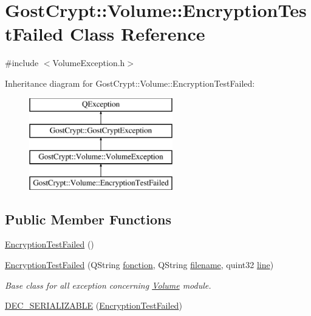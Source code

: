 \hypertarget{class_gost_crypt_1_1_volume_1_1_encryption_test_failed}{}\section{Gost\+Crypt\+:\+:Volume\+:\+:Encryption\+Test\+Failed Class Reference}
\label{class_gost_crypt_1_1_volume_1_1_encryption_test_failed}


{\ttfamily \#include $<$Volume\+Exception.\+h$>$}

Inheritance diagram for Gost\+Crypt\+:\+:Volume\+:\+:Encryption\+Test\+Failed\+:\begin{figure}[H]
\begin{center}
\leavevmode
\includegraphics[height=4.000000cm]{class_gost_crypt_1_1_volume_1_1_encryption_test_failed}
\end{center}
\end{figure}
\subsection*{Public Member Functions}
\begin{DoxyCompactItemize}
\item 
\hyperlink{class_gost_crypt_1_1_volume_1_1_encryption_test_failed_a3e1a882b6c494d5bfa33ed7c0c77e755}{Encryption\+Test\+Failed} ()
\item 
\hyperlink{class_gost_crypt_1_1_volume_1_1_encryption_test_failed_a5043d8bc7bfbff66740c512cf01531d8}{Encryption\+Test\+Failed} (Q\+String \hyperlink{class_gost_crypt_1_1_gost_crypt_exception_a29b8c93d5efbb1ff369107385725a939}{fonction}, Q\+String \hyperlink{class_gost_crypt_1_1_gost_crypt_exception_a749a12375f4ba9d502623b99d8252f38}{filename}, quint32 \hyperlink{class_gost_crypt_1_1_gost_crypt_exception_abf506d911f12a4e969eea500f90bd32c}{line})
\begin{DoxyCompactList}\small\item\em Base class for all exception concerning \hyperlink{class_gost_crypt_1_1_volume_1_1_volume}{Volume} module. \end{DoxyCompactList}\item 
\hyperlink{class_gost_crypt_1_1_volume_1_1_encryption_test_failed_a4eea7cc8b2dac36e5edd1391146f3d6b}{D\+E\+C\+\_\+\+S\+E\+R\+I\+A\+L\+I\+Z\+A\+B\+LE} (\hyperlink{class_gost_crypt_1_1_volume_1_1_encryption_test_failed}{Encryption\+Test\+Failed})
\end{DoxyCompactItemize}
